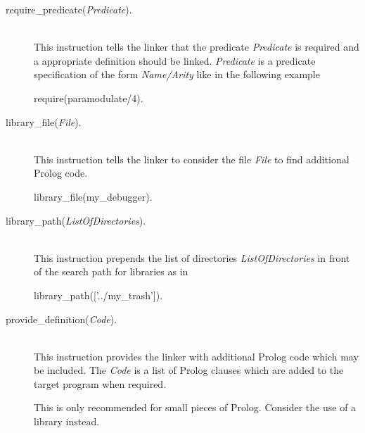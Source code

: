 \begin{description}
  \item [require\_predicate({\em Predicate}).]\ \\
	This instruction tells the linker that the predicate {\em Predicate}\/
	is required and a appropriate definition should be linked. {\em
	Predicate}\/ is a predicate specification of the form {\em
	Name/Arity}\/ like in the following example

\begin{BoxedSample}
  require(paramodulate/4).
\end{BoxedSample}

  \item [library\_file({\em File}).]\ \\
	This instruction tells the linker to consider the file {\em File} to
	find additional Prolog code.

\begin{BoxedSample}
  library\_file(my\_debugger).
\end{BoxedSample}

  \item [library\_path({\em ListOfDirectories}).]\ \\
	This instruction prepends the list of directories {\em
	ListOfDirectories} in front of the search path for libraries as in

\begin{BoxedSample}
  library\_path(['../my\_trash']).
\end{BoxedSample}

  \item [provide\_definition({\em Code}).]\ \\
	This instruction provides the linker with additional Prolog code which
	may be included. The {\em Code}\/ is a list of Prolog clauses which
	are added to the target program when required.

	This is only recommended for small pieces of Prolog. Consider the use
	of a library instead.
\end{description}

